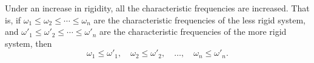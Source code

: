 Under an increase in rigidity, all the characteristic frequencies are increased. That is, if $\omega_1 \leq \omega_2 \leq \cdots \leq \omega_n$ are the characteristic frequencies of the less rigid system, and $\omega'_1 \leq \omega'_2 \leq \cdots \leq \omega'_n$ are the characteristic frequencies of the more rigid system, then
$$\omega_1 \leq \omega'_1,\quad \omega_2 \leq \omega'_2,\quad \ldots,\quad \omega_n \leq \omega'_n.$$
